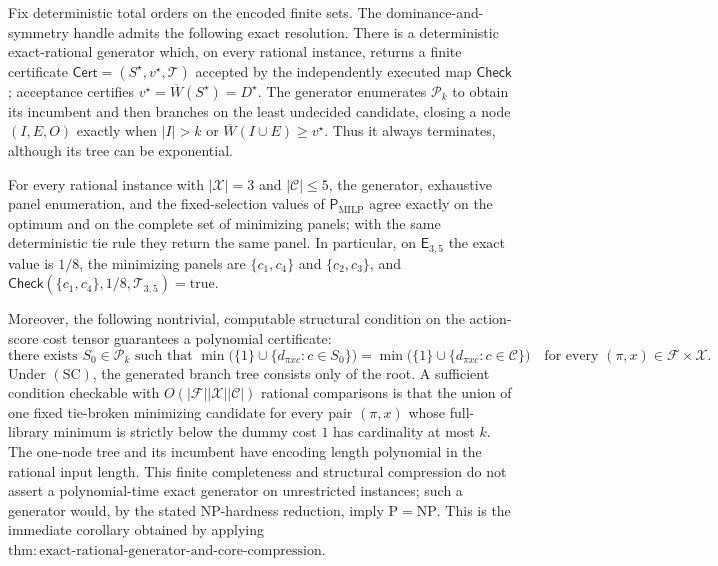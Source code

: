 Fix deterministic total orders on the encoded finite sets. The dominance-and-symmetry handle admits the following exact resolution. There is a deterministic exact-rational generator which, on every rational instance, returns a finite certificate \(\mathsf{Cert}=(S^{\star},v^{\star},\mathcal T)\) accepted by the independently executed map \(\mathsf{Check}\); acceptance certifies \(v^{\star}=\overline W(S^{\star})=D^{\star}\). The generator enumerates \(\mathcal P_k\) to obtain its incumbent and then branches on the least undecided candidate, closing a node \((I,E,O)\) exactly when \(|I|>k\) or \(\overline W(I\cup E)\geq v^{\star}\). Thus it always terminates, although its tree can be exponential.

For every rational instance with \(|\mathcal X|=3\) and \(|\mathcal C|\leq5\), the generator, exhaustive panel enumeration, and the fixed-selection values of \(\mathsf P_{\mathrm{MILP}}\) agree exactly on the optimum and on the complete set of minimizing panels; with the same deterministic tie rule they return the same panel. In particular, on \(\mathsf E_{3,5}\) the exact value is \(1/8\), the minimizing panels are \(\{c_1,c_4\}\) and \(\{c_2,c_3\}\), and \(\mathsf{Check}(\{c_1,c_4\},1/8,\mathcal T_{3,5})=\mathrm{true}\).

Moreover, the following nontrivial, computable structural condition on the action-score cost tensor guarantees a polynomial certificate:
\[
 \text{there exists }S_0\in\mathcal P_k\text{ such that }
 \min\bigl(\{1\}\cup\{d_{\pi xc}:c\in S_0\}\bigr)
 =\min\bigl(\{1\}\cup\{d_{\pi xc}:c\in\mathcal C\}\bigr)
 \quad\text{for every }(\pi,x)\in\mathcal F\times\mathcal X. \tag{SC}
\]
Under \(\mathrm{(SC)}\), the generated branch tree consists only of the root. A sufficient condition checkable with \(O(|\mathcal F||\mathcal X||\mathcal C|)\) rational comparisons is that the union of one fixed tie-broken minimizing candidate for every pair \((\pi,x)\) whose full-library minimum is strictly below the dummy cost \(1\) has cardinality at most \(k\). The one-node tree and its incumbent have encoding length polynomial in the rational input length. This finite completeness and structural compression do not assert a polynomial-time exact generator on unrestricted instances; such a generator would, by the stated NP-hardness reduction, imply \(\mathrm P=\mathrm{NP}\).
This is the immediate corollary obtained by applying \(\mathrm{thm{:}exact\text{-}rational\text{-}generator\text{-}and\text{-}core\text{-}compression}\).
